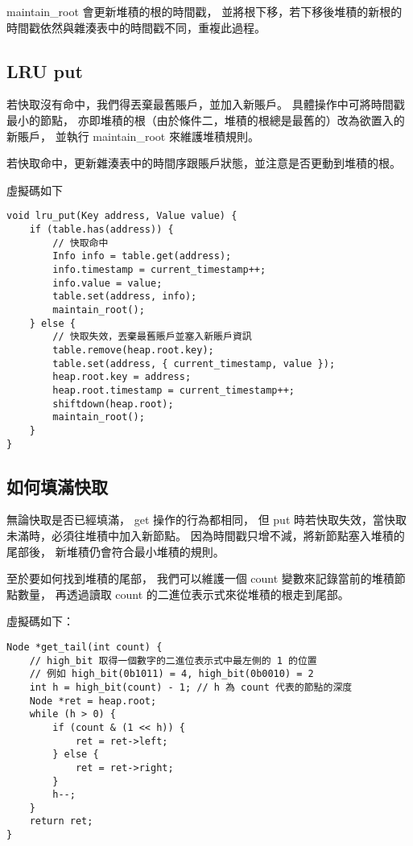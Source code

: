 maintain\_root 會更新堆積的根的時間戳，
並將根下移，若下移後堆積的新根的時間戳依然與雜湊表中的時間戳不同，重複此過程。

\subsection{LRU put}
若快取沒有命中，我們得丟棄最舊賬戶，並加入新賬戶。
具體操作中可將時間戳最小的節點，
亦即堆積的根（由於條件二，堆積的根總是最舊的）改為欲置入的新賬戶，
並執行 maintain\_root 來維護堆積規則。

若快取命中，更新雜湊表中的時間序跟賬戶狀態，並注意是否更動到堆積的根。

虛擬碼如下

\begin{lstlisting}
void lru_put(Key address, Value value) {
    if (table.has(address)) {
        // 快取命中
        Info info = table.get(address);
        info.timestamp = current_timestamp++;
        info.value = value;
        table.set(address, info);
        maintain_root();
    } else {
        // 快取失效，丟棄最舊賬戶並塞入新賬戶資訊
        table.remove(heap.root.key);
        table.set(address, { current_timestamp, value });
        heap.root.key = address;
        heap.root.timestamp = current_timestamp++;
        shiftdown(heap.root);
        maintain_root();
    }
}
\end{lstlisting}

\subsection{如何填滿快取}
無論快取是否已經填滿， get 操作的行為都相同，
但 put 時若快取失效，當快取未滿時，必須往堆積中加入新節點。
因為時間戳只增不減，將新節點塞入堆積的尾部後，
新堆積仍會符合最小堆積的規則。

至於要如何找到堆積的尾部，
我們可以維護一個 count 變數來記錄當前的堆積節點數量，
再透過讀取 count 的二進位表示式來從堆積的根走到尾部。

虛擬碼如下：

\begin{lstlisting}
Node *get_tail(int count) {
    // high_bit 取得一個數字的二進位表示式中最左側的 1 的位置
    // 例如 high_bit(0b1011) = 4, high_bit(0b0010) = 2
    int h = high_bit(count) - 1; // h 為 count 代表的節點的深度
    Node *ret = heap.root;
    while (h > 0) {
        if (count & (1 << h)) {
            ret = ret->left;
        } else {
            ret = ret->right;
        }
        h--;
    }
    return ret;
}
\end{lstlisting}

